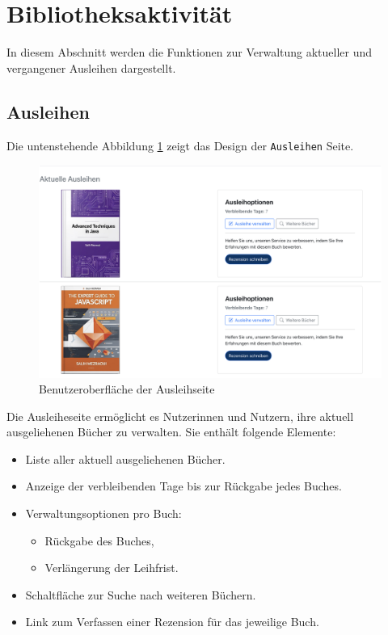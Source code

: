 \section{Bibliotheksaktivität}
In diesem Abschnitt werden die Funktionen zur Verwaltung aktueller und vergangener Ausleihen dargestellt.

\subsection{Ausleihen}
Die untenstehende Abbildung \ref{fig:Loans-Page} zeigt das Design der \texttt{Ausleihen} Seite. 

\begin{figure}[H]
	\centering
	\includegraphics[width=1.0\textwidth]{images/UI-screenshots/Loans-Page.png}
	\caption{Benutzeroberfläche der Ausleihseite}
	\label{fig:Loans-Page}
\end{figure}

Die Ausleiheseite ermöglicht es Nutzerinnen und Nutzern, ihre aktuell ausgeliehenen Bücher zu verwalten. Sie enthält folgende Elemente:

\begin{itemize}
	\item Liste aller aktuell ausgeliehenen Bücher.
	\item Anzeige der verbleibenden Tage bis zur Rückgabe jedes Buches.
	\item Verwaltungsoptionen pro Buch:
	\begin{itemize}
		\item Rückgabe des Buches,
		\item Verlängerung der Leihfrist.
	\end{itemize}
	\item Schaltfläche zur Suche nach weiteren Büchern.
	\item Link zum Verfassen einer Rezension für das jeweilige Buch.
\end{itemize}

